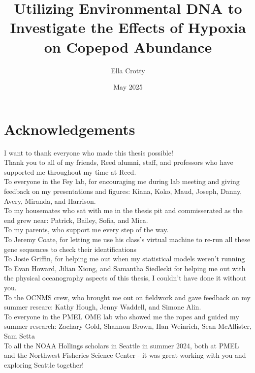 \documentclass[12pt,twoside]{reedthesis}
\title{Utilizing Environmental DNA to Investigate the Effects of Hypoxia on Copepod Abundance}
\author{Ella Crotty}
\date{May 2025}
\begin{document}
  \maketitle
  \frontmatter %
  \pagestyle{empty} %

    \chapter*{Acknowledgements}
	I want to thank everyone who made this thesis possible! \\
	Thank you to all of my friends, Reed alumni, staff, and professors who have supported me throughout my time at Reed. \\
	To everyone in the Fey lab, for encouraging me during lab meeting and giving feedback on my presentations and figures: Kiana, Koko, Maud, Joseph, Danny, Avery, Miranda, and Harrison. \\
	To my housemates who sat with me in the thesis pit and commisserated as the end grew near: Patrick, Bailey, Sofia, and Mica. \\
	To my parents, who support me every step of the way. \\
	To Jeremy Coate, for letting me use his class's virtual machine to re-run all these gene sequences to check their identifications \\
	To Josie Griffin, for helping me out when my statistical models weren't running \\
	To Evan Howard, Jilian Xiong, and Samantha Siedlecki for helping me out with the physical oceanography aspects of this thesis, I couldn't have done it without you. \\
	To the OCNMS crew, who brought me out on fieldwork and gave feedback on my summer researc: Kathy Hough, Jenny Waddell, and Simone Alin. \\
	To everyone in the PMEL OME lab who showed me the ropes and guided my summer research: Zachary Gold, Shannon Brown, Han Weinrich, Sean McAllister, Sam Setta \\
	To all the NOAA Hollings scholars in Seattle in summer 2024, both at PMEL and the Northwest Fisheries Science Center - it was great working with you and exploring Seattle together! \\

	
\end{document}
